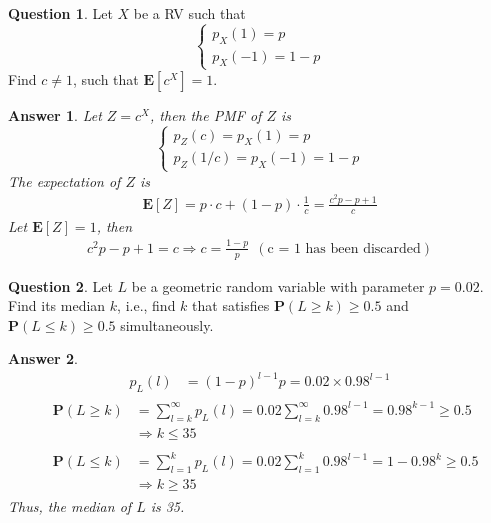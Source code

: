 \documentclass[utf8]{article}
\theoremstyle{definition}%
\newtheorem{question}{Question} %
\theoremstyle{plain}%
\newtheorem{answer}{Answer} %
\begin{document}
\begin{question}
    Let $X$ be a RV such that
    \begin{equation}
    \begin{cases}
        p_{X}(1) = p \\ 
        p_{X}(-1) = 1 - p
    \end{cases}
    \end{equation}
    Find $c \neq 1$, such that $\mathbf{E}[c^X] = 1$.
\end{question}
\begin{answer}
    Let $Z = c^X$, then the PMF of $Z$ is
    \begin{equation}
    \begin{cases}
        p_{Z}(c) = p_{X}(1) = p \\
        p_{Z}(1/c) = p_{X}(-1) = 1 - p
    \end{cases}
    \end{equation}
    The expectation of $Z$ is
    \begin{align}
        \mathbf{E}[Z] = p \cdot c + (1-p) \cdot \frac{1}{c} = \frac{c^2p - p + 1}{c}
    \end{align}
    Let $\mathbf{E}[Z] = 1$, then
    \begin{align}
        c^2p - p + 1 = c \Rightarrow c = \frac{1 - p}{p}~~(\text{c = 1 has been discarded})
    \end{align}
\end{answer}


\begin{question}
    Let $L$ be a geometric random variable with parameter $p = 0.02$. Find its median $k$, i.e., find $k$ that satisfies $\mathbf{P}(L \geq k) \geq 0.5$ and $\mathbf{P}(L \leq k) \geq 0.5$ simultaneously.
\end{question}
\begin{answer}
    \begin{align}
        p_{L}(l) &= (1 - p)^{l-1} p = 0.02 \times 0.98^{l-1} 
    \end{align}
    \begin{align}
    &\begin{aligned}
        \mathbf{P}(L \geq k) &= \sum_{l=k}^{\infty} p_{L}(l) = 0.02 \sum_{l=k}^{\infty} 0.98^{l-1} = 0.98^{k-1} \geq 0.5 \\
        &\Rightarrow k \leq 35
    \end{aligned} \\ 
    &\begin{aligned}
        \mathbf{P}(L \leq k) &= \sum_{l=1}^{k} p_{L}(l) = 0.02 \sum_{l=1}^{k} 0.98^{l-1} = 1 - 0.98^{k} \geq 0.5 \\
        &\Rightarrow k \geq 35
    \end{aligned}
    \end{align}
    Thus, the median of $L$ is 35.
\end{answer}
\end{document}
